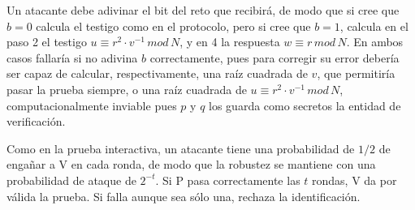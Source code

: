 Un atacante debe adivinar el bit del reto que recibirá, de modo que si cree que $b=0$ calcula el testigo como en el protocolo, pero si cree que $b=1$, calcula en el paso 2 el testigo $u \equiv r^2\cdot v^{-1} \, mod \, N$, y en 4 la respuesta $w \equiv r \, mod \, N$. En ambos casos fallaría si no adivina $b$ correctamente, pues para corregir su error debería ser capaz de calcular, respectivamente, una raíz cuadrada de $v$, que permitiría pasar la prueba siempre, o una raíz cuadrada de $u \equiv r^2\cdot v^{-1} \, mod \, N$, computacionalmente inviable pues $p$ y $q$ los guarda como secretos la entidad de verificación.

Como en la prueba interactiva, un atacante tiene una probabilidad de $1/2$ de engañar a V en cada ronda, de modo que la robustez se mantiene con una probabilidad de ataque de $2^{-t}$. Si P pasa correctamente las $t$ rondas, V da por válida la prueba. Si falla aunque sea sólo una, rechaza la identificación.





